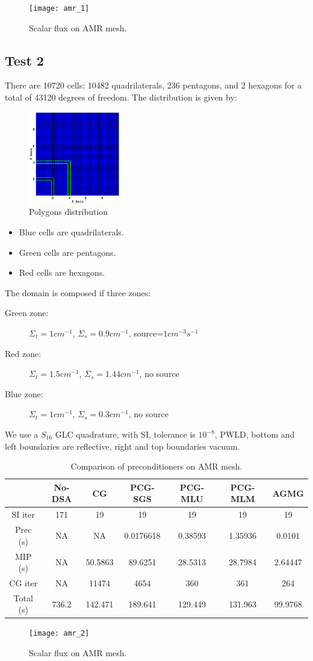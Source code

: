 \begin{figure}[H]
  \centering
  \texttt{[image: amr\_1]}
  \caption{Scalar flux on AMR mesh.}
\end{figure}
\subsection{Test 2}
There are 10720 cells: 10482 quadrilaterals, 236 pentagons, and 2 hexagons 
for a total of 43120 degrees of freedom. The distribution is given by:
\begin{figure}[H]
  \centering
  \includegraphics[width=4cm]{polygon_amr}
  \caption{Polygons distribution}
\end{figure}
\begin{itemize}
  \item Blue cells are quadrilaterals.
  \item Green cells are pentagons.
  \item Red cells are hexagons.
\end{itemize}
The domain is composed if three zones:
\begin{description}
  \item[Green zone:] $\Sigma_t=1cm^{-1}$, $\Sigma_s=0.9cm^{-1}$,
    source=$1cm^{-3}s^{-1}$
  \item[Red zone:] $\Sigma_t=1.5cm^{-1}$, $\Sigma_s=1.44cm^{-1}$, no source
  \item[Blue zone:] $\Sigma_t=1cm^{-1}$, $\Sigma_s=0.3cm^{-1}$, no source
\end{description}
We use a $S_{16}$ GLC quadrature, with SI, tolerance is $10^{-8}$, PWLD,
bottom and left boundaries are reflective, right and top boundaries vacuum.
\begin{table}[H]
  \caption{Comparison of preconditioners on AMR mesh.}
  \begin{center}
    \begin{tabular}{|c|c|c|c|c|c|c|}
      \hline
       & No-DSA & CG & PCG-SGS & PCG-MLU & PCG-MLM & AGMG \\
      \hline
      SI iter    & 171   & 19      & 19        & 19      & 19      & 19 \\
      Prec (s)   & NA    & NA      & 0.0176618 & 0.38593 & 1.35936 & 0.0101 \\
      MIP (s)    & NA    & 50.5863 & 89.6251   & 28.5313 & 28.7984 & 2.64447\\
      CG iter    & NA    & 11474   & 4654      & 360     & 361     & 264 \\
      Total (s)  & 736.2 & 142.471 & 189.641   & 129.449 & 131.963 & 99.9768\\
      \hline
    \end{tabular}
  \end{center}
\end{table}
\begin{figure}[H]
  \centering
  \texttt{[image: amr\_2]}
  \caption{Scalar flux on AMR mesh.}
\end{figure}
